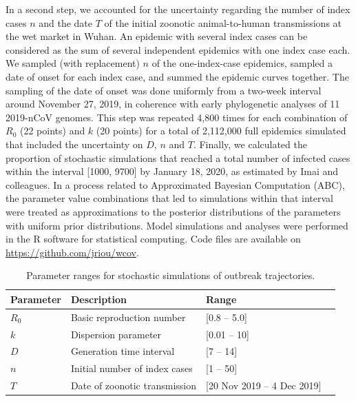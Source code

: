 \documentclass{article}
\begin{document}
In a second step, we accounted for the uncertainty regarding the number of index cases $n$ and the date $T$ of the initial zoonotic animal-to-human transmissions at the wet market in Wuhan. 
An epidemic with several index cases can be considered as the sum of several independent epidemics with one index case each.
We sampled (with replacement) $n$ of the one-index-case epidemics, sampled a date of onset for each index case, and summed the epidemic curves together.
The sampling of the date of onset was done uniformly from a two-week interval around November 27, 2019, in coherence with early phylogenetic analyses of 11 2019-nCoV genomes.\cite{Rambaut:2020}
This step was repeated 4,800 times for each combination of $R_0$ (22 points) and $k$ (20 points) for a total of 2,112,000 full epidemics simulated that included the uncertainty on $D$, $n$ and $T$.
Finally, we calculated the proportion of stochastic simulations that reached a total number of infected cases within the interval [1000, 9700] by January 18, 2020, as estimated by Imai and colleagues.\cite{Imai:2020}
In a process related to Approximated Bayesian Computation (ABC), the parameter value combinations that led to simulations within that interval were treated as approximations to the posterior distributions of the parameters with uniform prior distributions.
Model simulations and analyses were performed in the R software for statistical computing.\cite{R:2018} 
Code files are available on \url{https://github.com/jriou/wcov}.

\begin{table}
	\centering
	\caption{Parameter ranges for stochastic simulations of outbreak trajectories.}
	\label{fig:tab1}
\begin{tabular}{llll}
	\hline
	Parameter & Description & Range   \\
	\hline 
	$R_0$& Basic reproduction number  &[0.8 -- 5.0] \\ 
	$k$ & Dispersion parameter & [0.01 -- 10] \\
	$D$ & Generation time interval & [7 -- 14]  \\
	$n$ & Initial number of index cases & [1 -- 50]  \\
	$T$ & Date of zoonotic transmission & [20 Nov 2019 -- 4 Dec 2019] \\
	
	\hline 
\end{tabular} 
\end{table}
\end{document}
